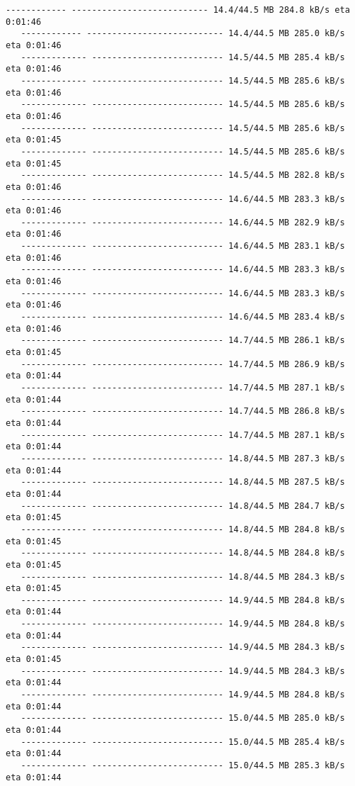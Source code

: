 \documentclass[11pt]{article}
\begin{document}
\begin{Verbatim}[commandchars=\\\{\}]
   ------------ --------------------------- 14.4/44.5 MB 284.8 kB/s eta 0:01:46
   ------------ --------------------------- 14.4/44.5 MB 285.0 kB/s eta 0:01:46
   ------------- -------------------------- 14.5/44.5 MB 285.4 kB/s eta 0:01:46
   ------------- -------------------------- 14.5/44.5 MB 285.6 kB/s eta 0:01:46
   ------------- -------------------------- 14.5/44.5 MB 285.6 kB/s eta 0:01:46
   ------------- -------------------------- 14.5/44.5 MB 285.6 kB/s eta 0:01:45
   ------------- -------------------------- 14.5/44.5 MB 285.6 kB/s eta 0:01:45
   ------------- -------------------------- 14.5/44.5 MB 282.8 kB/s eta 0:01:46
   ------------- -------------------------- 14.6/44.5 MB 283.3 kB/s eta 0:01:46
   ------------- -------------------------- 14.6/44.5 MB 282.9 kB/s eta 0:01:46
   ------------- -------------------------- 14.6/44.5 MB 283.1 kB/s eta 0:01:46
   ------------- -------------------------- 14.6/44.5 MB 283.3 kB/s eta 0:01:46
   ------------- -------------------------- 14.6/44.5 MB 283.3 kB/s eta 0:01:46
   ------------- -------------------------- 14.6/44.5 MB 283.4 kB/s eta 0:01:46
   ------------- -------------------------- 14.7/44.5 MB 286.1 kB/s eta 0:01:45
   ------------- -------------------------- 14.7/44.5 MB 286.9 kB/s eta 0:01:44
   ------------- -------------------------- 14.7/44.5 MB 287.1 kB/s eta 0:01:44
   ------------- -------------------------- 14.7/44.5 MB 286.8 kB/s eta 0:01:44
   ------------- -------------------------- 14.7/44.5 MB 287.1 kB/s eta 0:01:44
   ------------- -------------------------- 14.8/44.5 MB 287.3 kB/s eta 0:01:44
   ------------- -------------------------- 14.8/44.5 MB 287.5 kB/s eta 0:01:44
   ------------- -------------------------- 14.8/44.5 MB 284.7 kB/s eta 0:01:45
   ------------- -------------------------- 14.8/44.5 MB 284.8 kB/s eta 0:01:45
   ------------- -------------------------- 14.8/44.5 MB 284.8 kB/s eta 0:01:45
   ------------- -------------------------- 14.8/44.5 MB 284.3 kB/s eta 0:01:45
   ------------- -------------------------- 14.9/44.5 MB 284.8 kB/s eta 0:01:44
   ------------- -------------------------- 14.9/44.5 MB 284.8 kB/s eta 0:01:44
   ------------- -------------------------- 14.9/44.5 MB 284.3 kB/s eta 0:01:45
   ------------- -------------------------- 14.9/44.5 MB 284.3 kB/s eta 0:01:44
   ------------- -------------------------- 14.9/44.5 MB 284.8 kB/s eta 0:01:44
   ------------- -------------------------- 15.0/44.5 MB 285.0 kB/s eta 0:01:44
   ------------- -------------------------- 15.0/44.5 MB 285.4 kB/s eta 0:01:44
   ------------- -------------------------- 15.0/44.5 MB 285.3 kB/s eta 0:01:44

\end{Verbatim}
\end{document}
